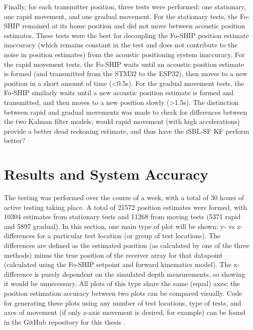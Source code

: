 \documentclass[12pt,a4paper]{report}
\begin{document}
Finally, for each transmitter position, three tests were performed: one stationary, one rapid movement, and one gradual movement. For the stationary tests, the Fo-SHIP remained at its home position and did not move between acoustic position estimates. These tests were the best for decoupling the Fo-SHIP position estimate inaccuracy (which remains constant in the test and does not contribute to the noise in position estimates) from the acoustic positioning system inaccuracy. For the rapid movement tests, the Fo-SHIP waits until an acoustic position estimate is formed (and transmitted from the STM32 to the ESP32), then moves to a new position in a short amount of time (\textless0.5s). For the gradual movement tests, the Fo-SHIP similarly waits until a new acoustic position estimate is formed and transmitted, and then moves to a new position slowly (\textgreater1.5s). The distinction between rapid and gradual movements was made to check for differences between the two Kalman filter models; would rapid movement (with high accelerations) provide a better dead reckoning estimate, and thus have the iSBL-SF KF perform better?

\section{Results and System Accuracy} \label{sec:6s2}
The testing was performed over the course of a week, with a total of 30 hours of active testing taking place. A total of 21572 position estimates were formed, with 10304 estimates from stationary tests and 11268 from moving tests (5371 rapid and 5897 gradual). In this section, one main type of plot will be shown: y- vs z-differences for a particular test location (or group of test locations). The differences are defined as the estimated position (as calculated by one of the three methods) minus the true position of the receiver array for that datapoint (calculated using the Fo-SHIP setpoint and forward kinematics model). The x-difference is purely dependent on the simulated depth measurements, so showing it would be unnecessary. All plots of this type share the same (equal) axes; the position estimation accuracy between two plots can be compared visually. Code for generating these plots using any number of test locations, type of tests, and axes of movement (if only z-axis movement is desired, for example) can be found in the GitHub repository for this thesis \cite{thesisgit}.
\end{document}
